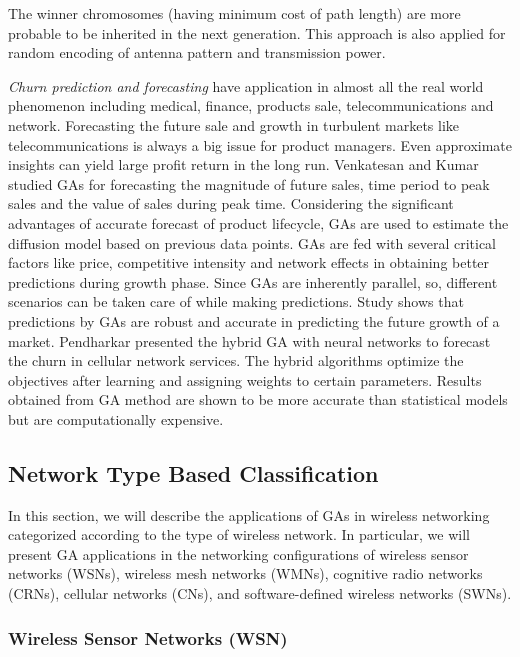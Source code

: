 \documentclass[journal]{IEEEtran}
\begin{document}
The winner chromosomes (having minimum cost of path length) are more probable to be inherited in the next generation. This approach is also applied for random encoding of antenna pattern and transmission power.

\vspace{2mm}
\textit{Churn prediction and forecasting} have application in almost all the real world phenomenon including medical, finance, products sale, telecommunications and network. Forecasting the future sale and growth in turbulent markets like telecommunications is always a big issue for product managers. Even approximate insights can yield large profit return in the long run. Venkatesan and Kumar studied GAs for forecasting \cite{venkatesan2002genetic} the magnitude of future sales, time period to peak sales and the value of sales during peak time. Considering the significant advantages of accurate forecast of product lifecycle, GAs are used to estimate the diffusion model based on previous data points. GAs are fed with several critical factors like price, competitive intensity and network effects in obtaining better predictions during growth phase. Since GAs are inherently parallel, so, different scenarios can be taken care of while making predictions. Study shows that predictions by GAs are robust and accurate in predicting the future growth of a market. Pendharkar \cite{pendharkar2009genetic} presented the hybrid GA with neural networks to forecast the churn in cellular network services. The hybrid algorithms optimize the objectives after learning and assigning weights to certain parameters. Results obtained from GA method are shown to be more accurate than statistical models but are computationally expensive. 

\subsection{\textbf{Network Type Based Classification}}
\label{sec:networkbased}

In this section, we will describe the applications of GAs in wireless networking categorized according to the type of wireless network. In particular, we will present GA applications in the networking configurations of wireless sensor networks (WSNs), wireless mesh networks (WMNs), cognitive radio networks (CRNs),  cellular networks (CNs), and software-defined wireless networks (SWNs).

\vspace{2mm}  
\subsubsection{Wireless Sensor Networks (WSN)}
\end{document}
